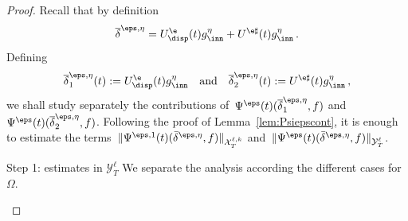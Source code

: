 \begin{proof}
Recall that by definition
\[
\overline\delta^{\eps,\eta}= U^\e_{\disp}(t)g^{\eta}_{\inn} +U^{\e\sharp}(t) g^{\eta}_{\inn}\,.
\]
Defining
\begin{equation}\label{decompositiontildeg}
\overline \delta^{\eps,\eta}_1(t):=U^\e_{\disp}(t)g^{\eta}_{\inn} \quad \text{and} \quad \overline \delta^{\eps,\eta}_2(t):=U^{\e\sharp}(t) g^{\eta}_{\inn} \,,
\end{equation}
we shall study separately the contributions of~$\Psi^\eps(t)(\overline \delta^{\eps,\eta}_1,f)$ and $\Psi^\eps(t)(\overline \delta^{\eps,\eta}_2,f)$. Following the proof of Lemma~\ref{lem:Psiepscont}, it is enough to estimate the terms~$\|\Psi^{\eps,1}(t)(\bar\delta^{\eps,\eta},f) \|_{\mathcal{X}^{\ell,k}_T}$ and~$\|\Psi^{\eps}(t)(\bar\delta^{\eps,\eta},f) \|_{\mathcal{Y}^{\ell}_T}$.


\begin{step}{Step 1: estimates in $\mathcal{Y}^\ell_T$}
We separate the analysis according the different cases for~$\Omega$.


\end{step}
\end{proof}
